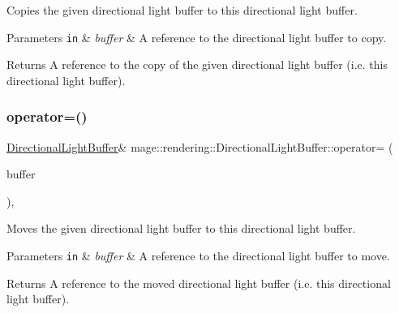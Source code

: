 Copies the given directional light buffer to this directional light buffer.


\begin{DoxyParams}[1]{Parameters}
\mbox{\tt in}  & {\em buffer} & A reference to the directional light buffer to copy. \\
\hline
\end{DoxyParams}
\begin{DoxyReturn}{Returns}
A reference to the copy of the given directional light buffer (i.\+e. this directional light buffer). 
\end{DoxyReturn}
\hypertarget{structmage_1_1rendering_1_1_directional_light_buffer_adb98ba5e4772ab90af749e521a6a6593}{}\label{structmage_1_1rendering_1_1_directional_light_buffer_adb98ba5e4772ab90af749e521a6a6593} 
\subsubsection{\texorpdfstring{operator=()}{operator=()}\hspace{0.1cm}{\footnotesize\ttfamily [2/2]}}
{\footnotesize\ttfamily \hyperlink{structmage_1_1rendering_1_1_directional_light_buffer}{Directional\+Light\+Buffer}\& mage\+::rendering\+::\+Directional\+Light\+Buffer\+::operator= (\begin{DoxyParamCaption}\item[{\hyperlink{structmage_1_1rendering_1_1_directional_light_buffer}{Directional\+Light\+Buffer} \&\&}]{buffer }\end{DoxyParamCaption})\hspace{0.3cm}{\ttfamily [default]}, {\ttfamily [noexcept]}}

Moves the given directional light buffer to this directional light buffer.


\begin{DoxyParams}[1]{Parameters}
\mbox{\tt in}  & {\em buffer} & A reference to the directional light buffer to move. \\
\hline
\end{DoxyParams}
\begin{DoxyReturn}{Returns}
A reference to the moved directional light buffer (i.\+e. this directional light buffer). 
\end{DoxyReturn}


